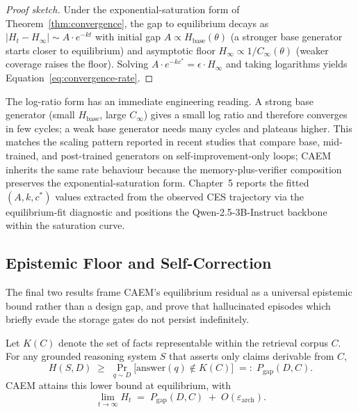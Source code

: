 \begin{proof}[Proof sketch]
Under the exponential-saturation form of Theorem~\ref{thm:convergence}, the gap to equilibrium decays as $\lvert H_{t} - H_{\infty}\rvert \sim A \cdot e^{-kt}$ with initial gap $A \propto H_{\text{base}}(\theta)$ (a stronger base generator starts closer to equilibrium) and asymptotic floor $H_{\infty} \propto 1 / C_{\infty}(\theta)$ (weaker coverage raises the floor). Solving $A \cdot e^{-k c^{*}} = \epsilon \cdot H_{\infty}$ and taking logarithms yields Equation~\ref{eq:convergence-rate}.
\end{proof}

The log-ratio form has an immediate engineering reading. A strong base generator (small $H_{\text{base}}$, large $C_{\infty}$) gives a small log ratio and therefore converges in few cycles; a weak base generator needs many cycles and plateaus higher. This matches the scaling pattern reported in recent studies that compare base, mid-trained, and post-trained generators on self-improvement-only loops; CAEM inherits the same rate behaviour because the memory-plus-verifier composition preserves the exponential-saturation form. Chapter~5 reports the fitted $(A, k, c^{*})$ values extracted from the observed CES trajectory via the equilibrium-fit diagnostic and positions the Qwen-2.5-3B-Instruct backbone within the saturation curve.

\subsection{Epistemic Floor and Self-Correction}
\label{sec:epistemic-floor}

The final two results frame CAEM's equilibrium residual as a universal epistemic bound rather than a design gap, and prove that hallucinated episodes which briefly evade the storage gates do not persist indefinitely.

\begin{corollary}
\label{cor:corpus-floor}
Let $K(C)$ denote the set of facts representable within the retrieval corpus $C$. For any grounded reasoning system $S$ that asserts only claims derivable from $C$,
\begin{equation}
H(S, D) \;\geq\; \Pr_{q \sim D}\!\bigl[\text{answer}(q) \notin K(C)\bigr] \;=:\; P_{\text{gap}}(D, C).
\label{eq:corpus-floor}
\end{equation}
CAEM attains this lower bound at equilibrium, with
\begin{equation*}
\lim_{t \to \infty} H_{t} \;=\; P_{\text{gap}}(D, C) \;+\; O(\varepsilon_{\text{arch}}).
\end{equation*}
\end{corollary}

